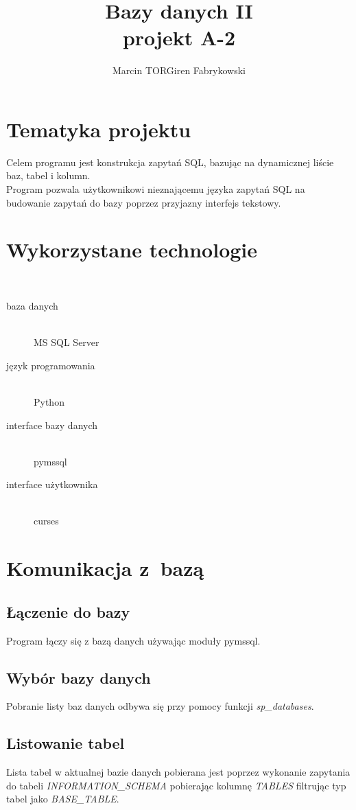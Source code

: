 \documentclass[a4paper,12pt]{article}
\author{Marcin TORGiren Fabrykowski}
\title{Bazy danych II\\ projekt A-2}
\begin{document}
\maketitle
\newpage
\tableofcontents
\newpage
\section{Tematyka projektu}
Celem programu jest konstrukcja zapytań SQL, bazując na dynamicznej liście baz, tabel i kolumn.\\
Program pozwala użytkownikowi nieznającemu języka zapytań SQL na budowanie zapytań do bazy poprzez przyjazny interfejs tekstowy.
\section{Wykorzystane technologie}\
\begin{description}
\item[baza danych]\hfill \\
	MS SQL Server
\item[język programowania]\hfill \\
	Python
\item[interface bazy danych]\hfill \\
	pymssql	
\item[interface użytkownika]\hfill \\
	curses
\end{description}
\section{Komunikacja z~bazą}
\subsection{Łączenie do bazy}
Program łączy się z bazą danych używając moduły pymssql.\\
\subsection{Wybór bazy danych}
Pobranie listy baz danych odbywa się przy pomocy funkcji \textit{sp\_databases}.\\
\subsection{Listowanie tabel}
Lista tabel w aktualnej bazie danych pobierana jest poprzez wykonanie zapytania do tabeli \textit{INFORMATION\_SCHEMA} pobierając kolumnę \textit{TABLES} filtrując typ tabel jako \textit{BASE\_TABLE}.
\end{document}
